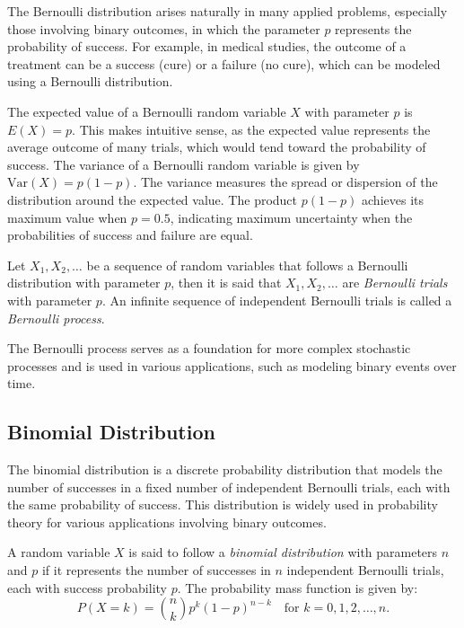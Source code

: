 The Bernoulli distribution arises naturally in many applied problems, especially those involving binary outcomes, in which the parameter $p$ represents the probability of success. For example, in medical studies, the outcome of a treatment can be a success (cure) or a failure (no cure), which can be modeled using a Bernoulli distribution.

The expected value of a Bernoulli random variable $X$ with parameter $p$ is $E(X) = p$. This makes intuitive sense, as the expected value represents the average outcome of many trials, which would tend toward the probability of success. The variance of a Bernoulli random variable is given by $\text{Var}(X) = p(1 - p)$. The variance measures the spread or dispersion of the distribution around the expected value. The product $p(1 - p)$ achieves its maximum value when $p = 0.5$, indicating maximum uncertainty when the probabilities of success and failure are equal.

\begin{definition}
Let $X_{1}, X_{2}, \ldots$ be a sequence of random variables that follows a Bernoulli distribution with parameter $p$, then it is said that $X_{1}, X_{2}, \ldots$ are \emph{Bernoulli trials} with parameter $p$. An infinite sequence of independent Bernoulli trials is called a \emph{Bernoulli process}.
\end{definition}

The Bernoulli process serves as a foundation for more complex stochastic processes and is used in various applications, such as modeling binary events over time.

%
%

\subsection{Binomial Distribution}

The binomial distribution is a discrete probability distribution that models the number of successes in a fixed number of independent Bernoulli trials, each with the same probability of success. This distribution is widely used in probability theory for various applications involving binary outcomes.

\begin{definition}
A random variable $X$ is said to follow a \emph{binomial distribution} with parameters $n$ and $p$ if it represents the number of successes in $n$ independent Bernoulli trials, each with success probability $p$. The probability mass function is given by:
\[
P(X = k) = \binom{n}{k} p^k (1 - p)^{n - k} \quad \text{for } k = 0, 1, 2, \ldots, n.
\]
\end{definition}

